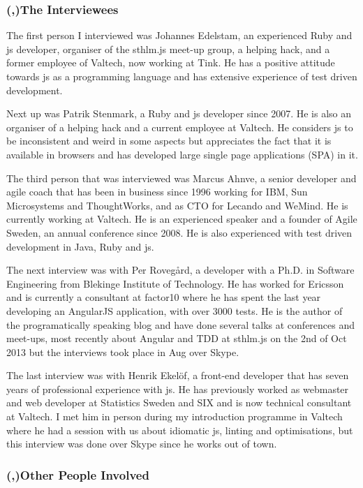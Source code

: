 \documentclass[11pt]{article}
\begin{document}
\subsubsection{(,)The Interviewees}
\label{ssubsec:interviewees}

The first person I interviewed was Johannes Edelstam, an experienced Ruby and \gls{js} developer, organiser of the sthlm.js meet-up group, a helping hack, and a former employee of Valtech, now working at Tink. He has a positive attitude towards \gls{js} as a programming language and has extensive experience of test driven development.

Next up was Patrik Stenmark, a Ruby and \gls{js} developer since 2007. He is also an organiser of a helping hack and a current employee at Valtech. He considers \gls{js} to be inconsistent and weird in some aspects but appreciates the fact that it is available in browsers and has developed large single page applications (SPA) in it.

The third person that was interviewed was Marcus Ahnve, a senior developer and agile coach that has been in business since 1996 working for IBM, Sun Microsystems and ThoughtWorks, and as CTO for Lecando and WeMind. He is currently working at Valtech. He is an experienced speaker and a founder of Agile Sweden, an annual conference since 2008. He is also experienced with test driven development in Java, Ruby and \gls{js}.

The next interview was with Per Rovegård, a developer with a Ph.D. in Software Engineering from Blekinge Institute of Technology. He has worked for Ericsson and is currently a consultant at factor10 where he has spent the last year developing an AngularJS application, with over 3000 tests. He is the author of the programatically speaking blog and have done several talks at conferences and meet-ups, most recently about Angular and TDD at sthlm.js on the 2nd of Oct 2013 but the interviews took place in Aug over Skype.

The last interview was with Henrik Ekelöf, a front-end developer that has seven years of professional experience with \gls{js}. He has previously worked as webmaster and web developer at Statistics Sweden and SIX and is now technical consultant at Valtech. I met him in person during my introduction programme in Valtech where he had a session with us about idiomatic \gls{js}, linting and optimisations, but this interview was done over Skype since he works out of town.

\subsubsection{(,)Other People Involved}
\end{document}
